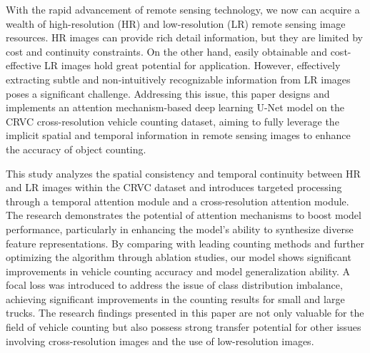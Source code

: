 With the rapid advancement of remote sensing technology, we now can acquire a wealth of high-resolution (HR) and low-resolution (LR) remote sensing image resources. HR images can provide rich detail information, but they are limited by cost and continuity constraints. On the other hand, easily obtainable and cost-effective LR images hold great potential for application. However, effectively extracting subtle and non-intuitively recognizable information from LR images poses a significant challenge. Addressing this issue, this paper designs and implements an attention mechanism-based deep learning U-Net model on the CRVC cross-resolution vehicle counting dataset, aiming to fully leverage the implicit spatial and temporal information in remote sensing images to enhance the accuracy of object counting.

This study analyzes the spatial consistency and temporal continuity between HR and LR images within the CRVC dataset and introduces targeted processing through a temporal attention module and a cross-resolution attention module. The research demonstrates the potential of attention mechanisms to boost model performance, particularly in enhancing the model's ability to synthesize diverse feature representations. By comparing with leading counting methods and further optimizing the algorithm through ablation studies, our model shows significant improvements in vehicle counting accuracy and model generalization ability. A focal loss was introduced to address the issue of class distribution imbalance, achieving significant improvements in the counting results for small and large trucks. The research findings presented in this paper are not only valuable for the field of vehicle counting but also possess strong transfer potential for other issues involving cross-resolution images and the use of low-resolution images.
